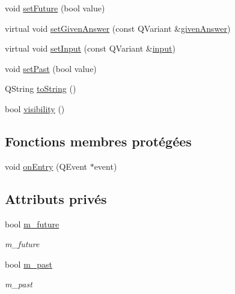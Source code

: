 \begin{DoxyCompactItemize}
void \hyperlink{classSimpleHotel_1_1SH__DateQuestionState_a85b9e8bde286e493bebbb3fdfb7da5e6}{set\-Future} (bool value)
\item 
virtual void \hyperlink{classSimpleHotel_1_1SH__QuestionState_aeb4464741ecd13b283c504def63dd619}{set\-Given\-Answer} (const Q\-Variant \&\hyperlink{classSimpleHotel_1_1SH__QuestionState_a243f09bc1f822af7748edb038ac2957c}{given\-Answer})
\item 
virtual void \hyperlink{classSimpleHotel_1_1SH__QuestionState_ae404d8874e542fd5f3e6d658f003bae4}{set\-Input} (const Q\-Variant \&\hyperlink{classSimpleHotel_1_1SH__InOutState_a487d2ca6200fed372b1a27cfa27774db}{input})
\item 
void \hyperlink{classSimpleHotel_1_1SH__DateQuestionState_a8b6a98b8e8197e52cc947cfe47445198}{set\-Past} (bool value)
\item 
Q\-String \hyperlink{classSimpleHotel_1_1SH__GenericState_adaded78178f9999a9e07a32871af5e61}{to\-String} ()
\item 
bool \hyperlink{classSimpleHotel_1_1SH__InOutState_a145a6e0e2c9e22971e35aa4538adeb4a}{visibility} ()
\end{DoxyCompactItemize}
\subsection*{Fonctions membres protégées}
\begin{DoxyCompactItemize}
\item 
void \hyperlink{classSimpleHotel_1_1SH__GenericState_adebdb330ff20556a54a833b15e50eacc}{on\-Entry} (Q\-Event $\ast$event)
\end{DoxyCompactItemize}
\subsection*{Attributs privés}
\begin{DoxyCompactItemize}
\item 
bool \hyperlink{classSimpleHotel_1_1SH__DateQuestionState_a8b2bfdd1b7629d44a2001fd2e175cd8e}{m\-\_\-future}
\begin{DoxyCompactList}\small\item\em m\-\_\-future \end{DoxyCompactList}\item 
bool \hyperlink{classSimpleHotel_1_1SH__DateQuestionState_a6fba9a845913331c378e2c0e9afef2e7}{m\-\_\-past}
\begin{DoxyCompactList}\small\item\em m\-\_\-past \end{DoxyCompactList}\end{DoxyCompactItemize}


